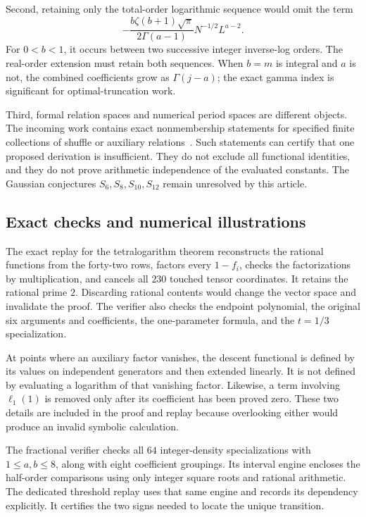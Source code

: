 Second, retaining only the total-order logarithmic sequence would
omit the term
\[
 -\frac{b\zeta(b+1)\sqrt\pi}{2\Gamma(a-1)}
 N^{-1/2}L^{a-2}.
\]
For $0<b<1$, it occurs between two successive integer inverse-log
orders. The real-order extension must retain both sequences.
When $b=m$ is integral and $a$ is not, the combined coefficients
grow as $\Gamma(j-a)$; the exact gamma index is significant for
optimal-truncation work.

Third, formal relation spaces and numerical period spaces are
different objects. The incoming work contains exact nonmembership
statements for specified finite collections of shuffle or auxiliary
relations~\cite{incoming-uniform}. Such statements can certify that
one proposed derivation is insufficient. They do not exclude all
functional identities, and they do not prove arithmetic independence
of the evaluated constants. The Gaussian conjectures
$S_6,S_8,S_{10},S_{12}$ remain unresolved by this article.

\subsection{Exact checks and numerical illustrations}

The exact replay for the tetralogarithm theorem reconstructs the
rational functions from the forty-two rows, factors every $1-f_i$,
checks the factorizations by multiplication, and cancels all $230$
touched tensor coordinates. It retains the rational prime $2$.
Discarding rational contents would change the vector space and
invalidate the proof. The verifier also checks the endpoint
polynomial, the original six arguments and coefficients, the
one-parameter formula, and the $t=1/3$ specialization.

At points where an auxiliary factor vanishes, the descent functional
is defined by its values on independent generators and then extended
linearly. It is not defined by evaluating a logarithm of that
vanishing factor. Likewise, a term involving $\ell_1(1)$ is removed
only after its coefficient has been proved zero. These two details
are included in the proof and replay because overlooking either
would produce an invalid symbolic calculation.

The fractional verifier checks all $64$ integer-density
specializations with $1\le a,b\le8$, along with eight coefficient
groupings. Its interval engine encloses the half-order comparisons
using only integer square roots and rational arithmetic. The
dedicated threshold replay uses that same engine and records its
dependency explicitly. It certifies the two signs needed to locate
the unique transition.

